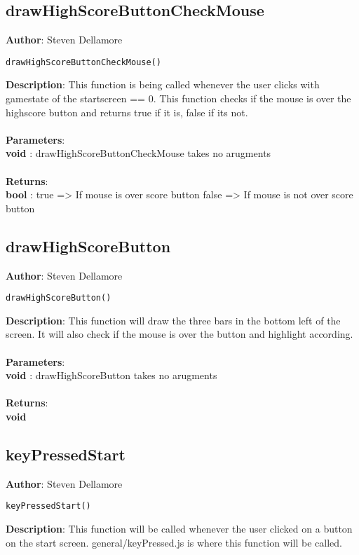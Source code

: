 \documentclass[12pt]{article}
\begin{document}
\subsection{drawHighScoreButtonCheckMouse}
\textbf{Author}: Steven Dellamore 
\vspace*{1\baselineskip}
\begin{lstlisting}
drawHighScoreButtonCheckMouse()
\end{lstlisting} 
\vspace*{1\baselineskip}
\textbf{Description}: This function is being called whenever the user clicks with gamestate of the startscreen == 0. This function checks if the mouse is over the highscore button and returns true if it is, false if its not. \\


\textbf{\large{\\Parameters}}:\\
\textbf{void }: drawHighScoreButtonCheckMouse takes no arugments\\\textbf{\large{\\Returns}}:\\\textbf{bool }: true => If mouse is over score button false => If mouse is not over score button

\subsection{drawHighScoreButton}
\textbf{Author}: Steven Dellamore 
\vspace*{1\baselineskip}
\begin{lstlisting}
drawHighScoreButton()
\end{lstlisting} 
\vspace*{1\baselineskip}
\textbf{Description}: This function will draw the three bars in the bottom left of the screen. It will also check if the mouse is over the button and highlight according. \\


\textbf{\large{\\Parameters}}:\\
\textbf{void }: drawHighScoreButton takes no arugments\\\textbf{\large{\\Returns}}:\\\textbf{void}

\subsection{keyPressedStart}
\textbf{Author}: Steven Dellamore 
\vspace*{1\baselineskip}
\begin{lstlisting}
keyPressedStart()
\end{lstlisting} 
\vspace*{1\baselineskip}
\textbf{Description}: This function will be called whenever the user clicked on a button on the start screen. general/keyPressed.js is where this function will be called. \\
\end{document}
